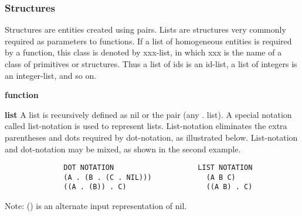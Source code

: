 \subsubsection{Structures}

 Structures are  entities  created  using  pairs.    Lists  are
structures  very  commonly  required as parameters to functions.
If a list of homogeneous entities is  required  by  a  function,
this class is denoted by xxx-list, in which xxx is the name of a
class  of  primitives  or  structures.  Thus a list of ids is an
id-list, a list of integers is an integer-list, and so on.

\begin{Ventry}{\bf function}
\item [{\bf list}]          A list   is  recursively   defined  as  
nil    or
              the  pair   (any . list).    A  special   notation
              called list-notation is used to  represent  lists.
              List-notation eliminates the extra parentheses and
              dots  required  by  dot-notation,  as  illustrated
              below.   List-notation  and  dot-notation  may  be
              mixed, as shown in the second example.
\end{Ventry}
              \begin{verbatim}
              DOT NOTATION                    LIST NOTATION
              (A . (B . (C . NIL)))             (A B C)
              ((A . (B)) . C)                   ((A B) . C)
              \end{verbatim}

              Note:  ()  is an alternate input representation of
              nil.

